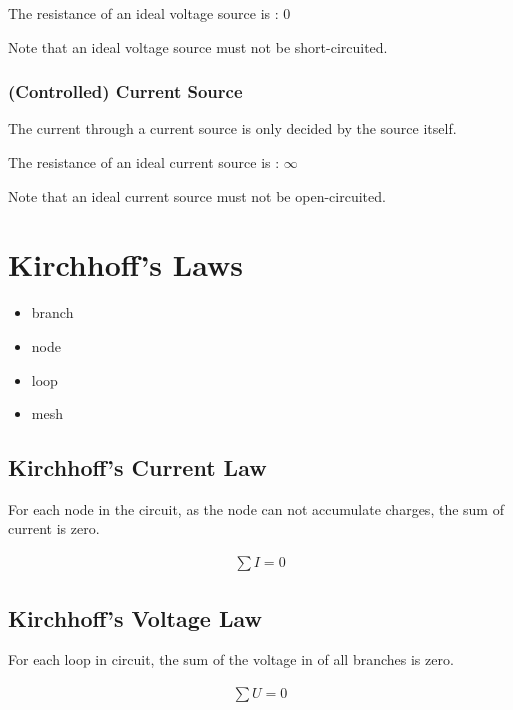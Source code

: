 The resistance of an ideal voltage source is : $0$

Note that an ideal voltage source must not be short-circuited.

\subsubsection{(Controlled) Current Source}

The current through a current source is only decided by the source itself.

The resistance of an ideal current source is : $\infty$

Note that an ideal current source must not be open-circuited.

\section{Kirchhoff's Laws}

\begin{itemize}
\item branch
\item node
\item loop
\item mesh
  
\end{itemize}

\subsection{Kirchhoff's Current Law}

For each node in the circuit, as the node can not accumulate charges, the sum of current is zero.

\begin{equation*}
  \begin{aligned}
    \sum I = 0
  \end{aligned}
\end{equation*}

\subsection{Kirchhoff's Voltage Law}

For each loop in circuit, the sum of the voltage in of all branches is zero.

\begin{equation*}
  \begin{aligned}
    \sum U = 0
  \end{aligned}
\end{equation*}

